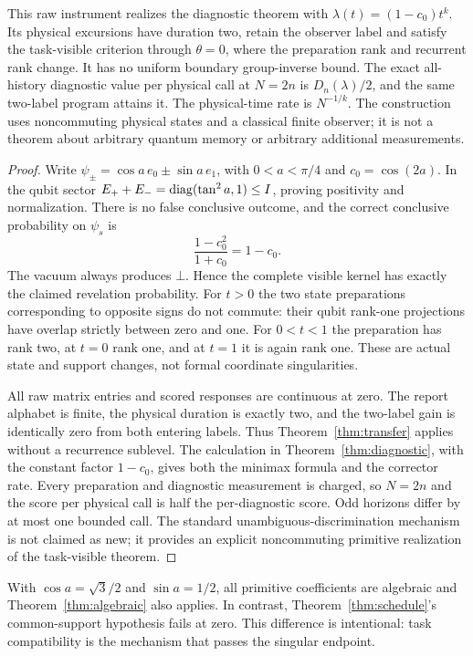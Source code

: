 \begin{theorem}\label{thm:quantum}
This raw instrument realizes the diagnostic theorem with $\lambda(t)=(1-c_0)t^k$. Its physical excursions have duration two, retain the observer label and satisfy the task-visible criterion through $\theta=0$, where the preparation rank and recurrent rank change. It has no uniform boundary group-inverse bound. The exact all-history diagnostic value per physical call at $N=2n$ is $D_n(\lambda)/2$, and the same two-label program attains it. The physical-time rate is $N^{-1/k}$. The construction uses noncommuting physical states and a classical finite observer; it is not a theorem about arbitrary quantum memory or arbitrary additional measurements.
\end{theorem}
\begin{proof}
Write $\psi_\pm=\cos a\,e_0\pm\sin a\,e_1$, with $0<a<\pi/4$ and $c_0=\cos(2a)$. In the qubit sector $E_++E_-=\operatorname{diag}(\tan^2 a,1)\le I$, proving positivity and normalization. There is no false conclusive outcome, and the correct conclusive probability on $\psi_s$ is
\[
 \frac{1-c_0^2}{1+c_0}=1-c_0.
\]
The vacuum always produces $\bot$. Hence the complete visible kernel has exactly the claimed revelation probability. For $t>0$ the two state preparations corresponding to opposite signs do not commute: their qubit rank-one projections have overlap strictly between zero and one. For $0<t<1$ the preparation has rank two, at $t=0$ rank one, and at $t=1$ it is again rank one. These are actual state and support changes, not formal coordinate singularities.

All raw matrix entries and scored responses are continuous at zero. The report alphabet is finite, the physical duration is exactly two, and the two-label gain is identically zero from both entering labels. Thus Theorem~\ref{thm:transfer} applies without a recurrence sublevel. The calculation in Theorem~\ref{thm:diagnostic}, with the constant factor $1-c_0$, gives both the minimax formula and the corrector rate. Every preparation and diagnostic measurement is charged, so $N=2n$ and the score per physical call is half the per-diagnostic score. Odd horizons differ by at most one bounded call. The standard unambiguous-discrimination mechanism~\cite{ClarkeCheflesBarnettRiis} is not claimed as new; it provides an explicit noncommuting primitive realization of the task-visible theorem.
\end{proof}
With $\cos a=\sqrt3/2$ and $\sin a=1/2$, all primitive coefficients are algebraic and Theorem~\ref{thm:algebraic} also applies. In contrast, Theorem~\ref{thm:schedule}'s common-support hypothesis fails at zero. This difference is intentional: task compatibility is the mechanism that passes the singular endpoint.
